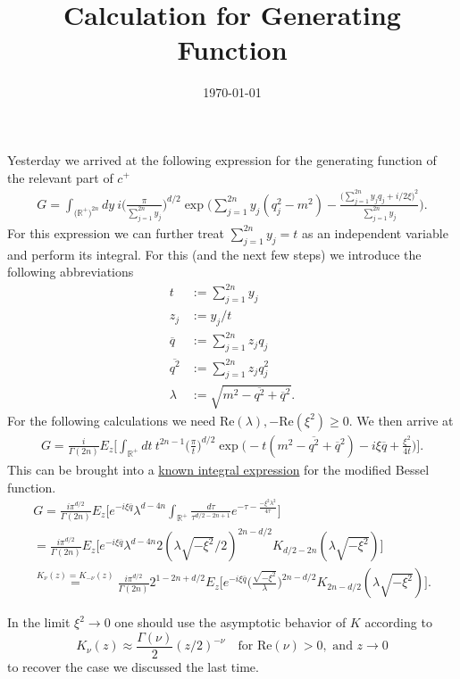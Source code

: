\documentclass[a4paper,11pt]{article}
\begin{document}
\title{Calculation for Generating Function}
\author{ }
\date{\today}
\maketitle


Yesterday we arrived at the following expression for 
the generating function of 
the relevant part of \(c^+\)
\begin{align}
G=\int_{\big(\mathbb{R}^+\big)^{2n}}dy ~i \bigg( \frac{\pi}{\sum_{j=1}^{2n}y_j}\bigg)^{d/2}
\exp\Bigg(\sum_{j=1}^{2n}y_j(q_j^2-m^2)-\frac{\big(\sum_{j=1}^{2n}y_j q_j + i/2 \xi\big)^2}{\sum_{j=1}^{2n}y_j}\Bigg).
\end{align}
For this expression we can further treat \(\sum_{j=1}^{2n}y_j=t\) 
as an independent variable and perform its integral. For this (and the next few steps) 
we introduce the following abbreviations
\begin{align}
  t&:=\sum_{j=1}^{2n}y_j\\
  z_j&:=y_j/t\\
  \overline{q}&:=\sum_{j=1}^{2n} z_j q_j\\
  \overline{q^2}&:=\sum_{j=1}^{2n} z_j q_j^2\\
  \lambda&:=\sqrt{m^2-\overline{q^2}+\overline{q}^2}.
\end{align}
For the following calculations we need 
\(\text{Re}(\lambda),-\text{Re}(\xi^2)\ge 0\). 
We then arrive at 
\begin{align}
  G=\frac{i}{\Gamma(2n)}E_z\Bigg[\int_{\mathbb{R}^+}dt ~t^{2n-1}\bigg(\frac{\pi}{t}\bigg)^{d/2} 
  \exp\bigg(-t(m^2-\overline{q^2}+\overline{q}^2)-i\xi \overline{q}+\frac{\xi^2}{4 t}\bigg)\Bigg].
\end{align}
This can be brought into a  
\href{https://dlmf.nist.gov/10.32#E10}{known integral expression}
for the 
 modified Bessel function.
\begin{align}
  G=\frac{i \pi^{d/2}}{\Gamma(2n)}E_z\Bigg[e^{-i \xi \overline{q}}\lambda^{d-4n}\int_{\mathbb{R}^+}\frac{d\tau}{\tau^{d/2-2n +1}}e^{-\tau - \frac{-\xi^2 \lambda^2}{4 \tau}} \Bigg]\\
  =\frac{i \pi^{d/2}}{\Gamma(2n)}E_z\bigg[e^{-i\xi \overline{q}} \lambda^{d-4n}2 (\lambda \sqrt{-\xi^2}/2)^{2n-d/2}K_{d/2-2n}(\lambda \sqrt{-\xi^2}) \bigg]\\
  \overset{K_\nu(z)=K_{-\nu}(z)}{=}\frac{i \pi^{d/2}}{\Gamma(2n)}2^{1-2n+d/2}E_z\Bigg[e^{-i\xi\overline{q}}\bigg(\frac{\sqrt{-\xi^2}}{\lambda}\bigg)^{2n-d/2}K_{2n-d/2}(\lambda\sqrt{-\xi^2}) \Bigg].
\end{align}

In the limit \(\xi^2\rightarrow 0\) one should 
use the asymptotic behavior of \(K\) according to
\begin{equation}
K_\nu(z)\approx \frac{\Gamma(\nu)}{2} (z/2)^{-\nu} \quad \text{for Re}(\nu)>0, \text{ and } z\rightarrow 0 
\end{equation}
to recover the case we discussed the last time.
\end{document}
